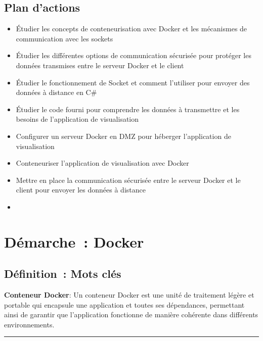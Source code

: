 \subsection*{Plan d'actions}
{}
\begin{itemize}
    \item Étudier les concepts de conteneurisation avec Docker et les mécanismes de communication avec les sockets
    \item Étudier les différentes options de communication sécurisée pour protéger les données transmises entre le serveur Docker et le client
    \item Étudier le fonctionnement de Socket et comment l'utiliser pour envoyer des données à distance en C\#
	\item Étudier le code fourni pour comprendre les données à transmettre et les besoins de l'application de visualisation
	\item Configurer un serveur Docker en DMZ pour héberger l'application de visualisation
	\item Conteneuriser l'application de visualisation avec Docker
	\item Mettre en place la communication sécurisée entre le serveur Docker et le client pour envoyer les données à distance
	\item 
\end{itemize}

\newpage
\section*{Démarche~: Docker}


\subsection*{Définition~: Mots clés}
{}

\noindent \textbf{Conteneur Docker}:
\noindent Un conteneur Docker est une unité de traitement légère et portable qui encapsule une application et toutes ses dépendances, permettant ainsi de garantir que l'application fonctionne de manière cohérente dans différents environnements.

\begin{center}
\rule{5cm}{0.4pt}
\end{center}

\vspace{0.5cm}

